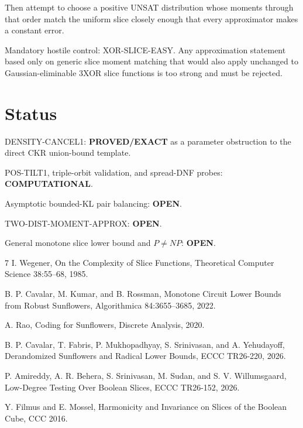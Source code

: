 \documentclass[11pt]{article}
\begin{document}
Then attempt to choose a positive UNSAT distribution whose moments through
that order match the uniform slice closely enough that every approximator
makes a constant error.

Mandatory hostile control: XOR-SLICE-EASY.  Any approximation statement based
only on generic slice moment matching that would also apply unchanged to
Gaussian-eliminable 3XOR slice functions is too strong and must be rejected.

\section{Status}

DENSITY-CANCEL1: \textbf{PROVED/EXACT} as a parameter obstruction to the
direct CKR union-bound template.

POS-TILT1, triple-orbit validation, and spread-DNF probes:
\textbf{COMPUTATIONAL}.

Asymptotic bounded-KL pair balancing: \textbf{OPEN}.

TWO-DIST-MOMENT-APPROX: \textbf{OPEN}.

General monotone slice lower bound and \(P\ne NP\): \textbf{OPEN}.

\begin{thebibliography}{7}
I. Wegener, On the Complexity of Slice Functions,
Theoretical Computer Science 38:55--68, 1985.

B. P. Cavalar, M. Kumar, and B. Rossman,
Monotone Circuit Lower Bounds from Robust Sunflowers,
Algorithmica 84:3655--3685, 2022.

A. Rao, Coding for Sunflowers,
Discrete Analysis, 2020.

B. P. Cavalar, T. Fabris, P. Mukhopadhyay, S. Srinivasan, and A. Yehudayoff,
Derandomized Sunflowers and Radical Lower Bounds,
ECCC TR26-220, 2026.

P. Amireddy, A. R. Behera, S. Srinivasan, M. Sudan, and S. V. Willumsgaard,
Low-Degree Testing Over Boolean Slices,
ECCC TR26-152, 2026.

Y. Filmus and E. Mossel,
Harmonicity and Invariance on Slices of the Boolean Cube,
CCC 2016.
\end{thebibliography}
\end{document}
